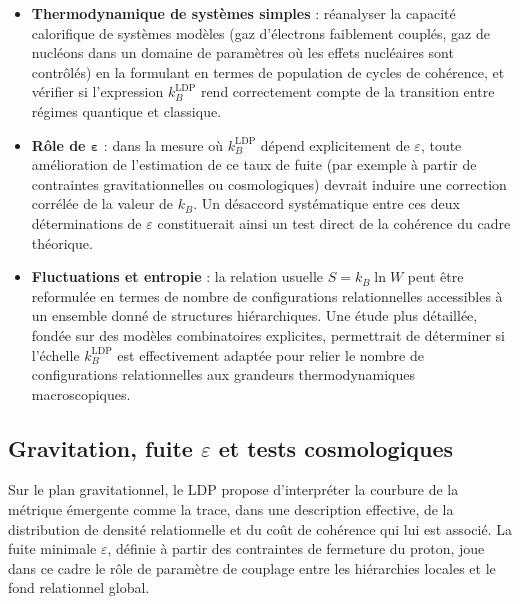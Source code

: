\documentclass[11pt,a4paper]{article}
\begin{document}
\begin{itemize}
  \item \textbf{Thermodynamique de systèmes simples} : réanalyser la capacité calorifique de systèmes modèles (gaz d’électrons faiblement couplés, gaz de nucléons dans un domaine de paramètres où les effets nucléaires sont contrôlés) en la formulant en termes de population de cycles de cohérence, et vérifier si l’expression \(k_B^{\mathrm{LDP}}\) rend correctement compte de la transition entre régimes quantique et classique.
  
  \item \textbf{Rôle de \(\mathbf{\varepsilon}\)} : dans la mesure où \(k_B^{\mathrm{LDP}}\) dépend explicitement de \(\varepsilon\), toute amélioration de l’estimation de ce taux de fuite (par exemple à partir de contraintes gravitationnelles ou cosmologiques) devrait induire une correction corrélée de la valeur de \(k_B\). Un désaccord systématique entre ces deux déterminations de \(\varepsilon\) constituerait ainsi un test direct de la cohérence du cadre théorique.
  
  \item \textbf{Fluctuations et entropie} : la relation usuelle \(S = k_B\ln{W}\) peut être reformulée en termes de nombre de configurations relationnelles accessibles à un ensemble donné de structures hiérarchiques. Une étude plus détaillée, fondée sur des modèles combinatoires explicites, permettrait de déterminer si l’échelle \(k_B^{\mathrm{LDP}}\) est effectivement adaptée pour relier le nombre de configurations relationnelles aux grandeurs thermodynamiques macroscopiques.
\end{itemize}

\subsection{Gravitation, fuite \texorpdfstring{\(\varepsilon\)}{epsilon} et tests cosmologiques}

Sur le plan gravitationnel, le LDP propose d’interpréter la courbure de la métrique émergente comme la trace, dans une description effective, de la distribution de densité relationnelle et du coût de cohérence qui lui est associé. La fuite minimale \(\varepsilon\), définie à partir des contraintes de fermeture du proton, joue dans ce cadre le rôle de paramètre de couplage entre les hiérarchies locales et le fond relationnel global.
\end{document}
